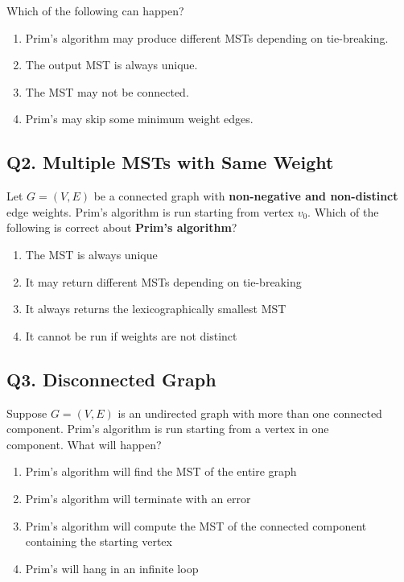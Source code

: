 Which of the following can happen?

\begin{enumerate}[label=(\alph*)]
    \item Prim's algorithm may produce different MSTs depending on tie-breaking.
    \item The output MST is always unique.
    \item The MST may not be connected.
    \item Prim’s may skip some minimum weight edges.
\end{enumerate}

\newpage
\subsection*{Q2. Multiple MSTs with Same Weight}
Let $G = (V, E)$ be a connected graph with \textbf{non-negative and non-distinct} edge weights. Prim's algorithm is run starting from vertex $v_0$.
\vspace{1em}
Which of the following is correct about \textbf{Prim's algorithm}?

\begin{enumerate}[label=(\alph*)]
    \item The MST is always unique
    \item It may return different MSTs depending on tie-breaking
    \item It always returns the lexicographically smallest MST
    \item It cannot be run if weights are not distinct
\end{enumerate}

\subsection*{Q3. Disconnected Graph}
Suppose $G = (V, E)$ is an undirected graph with more than one connected\\
component. Prim's algorithm is run starting from a vertex in one\\
component. What will happen?

\begin{enumerate}[label=(\alph*)]
    \item Prim's algorithm will find the MST of the entire graph
    \item Prim's algorithm will terminate with an error
    \item Prim's algorithm will compute the MST of the connected component containing the starting vertex
    \item Prim's will hang in an infinite loop
\end{enumerate}

